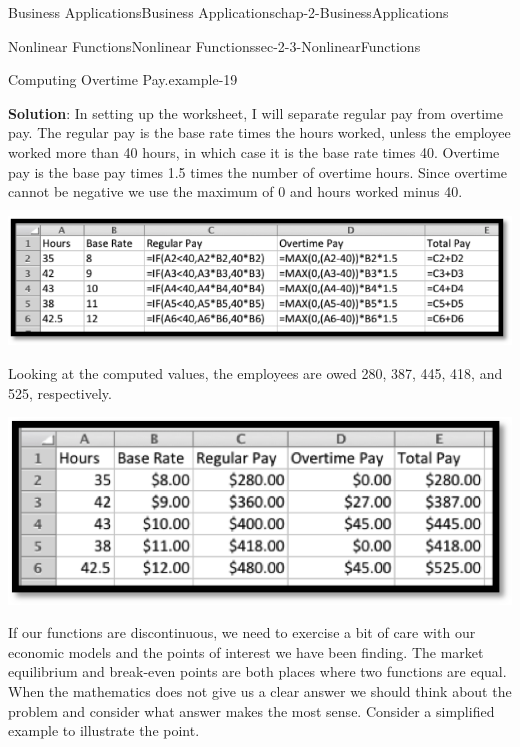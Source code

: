 \documentclass[oneside,10pt,]{book}
\newcommand{\terminology}[1]{\textbf{#1}}
\numberwithin{equation}{section}
\begin{document}
\begin{chapterptx}{Business Applications}{}{Business Applications}{}{}{chap-2-BusinessApplications}
\begin{sectionptx}{Nonlinear Functions}{}{Nonlinear Functions}{}{}{sec-2-3-NonlinearFunctions}
\begin{example}{Computing Overtime Pay.}{example-19}
\par
\hypertarget{p-792}{}%
\terminology{Solution}:  In setting up the worksheet, I will separate regular pay from overtime pay.  The regular pay is the base rate times the hours worked, unless the employee worked more than 40 hours, in which case it is the base rate times 40.  Overtime pay is the base pay times 1.5 times the number of overtime hours.  Since overtime cannot be negative we use the maximum of 0 and hours worked minus 40.%
\begin{sidebyside}{1}{0.1}{0.1}{0}%
\begin{sbspanel}{0.8}%
\includegraphics[width=1\linewidth]{images/sec2-3-7.png}
\end{sbspanel}%
\end{sidebyside}%
\par
\hypertarget{p-793}{}%
Looking at the computed values, the employees are owed \textdollar{}280, \textdollar{}387, \textdollar{}445, \textdollar{}418, and \textdollar{}525, respectively.%
\begin{sidebyside}{1}{0.25}{0.25}{0}%
\begin{sbspanel}{0.5}%
\includegraphics[width=1\linewidth]{images/sec2-3-8.png}
\end{sbspanel}%
\end{sidebyside}%
\end{example}
\hypertarget{p-794}{}%
If our functions are discontinuous, we need to exercise a bit of care with our economic models and the points of interest we have been finding.  The market equilibrium and break-even points are both places where two functions are equal.    When the mathematics does not give us a clear answer we should think about the problem and consider what answer makes the most sense.  Consider a simplified example to illustrate the point.%

\end{sectionptx}
\end{chapterptx}
\end{document}
